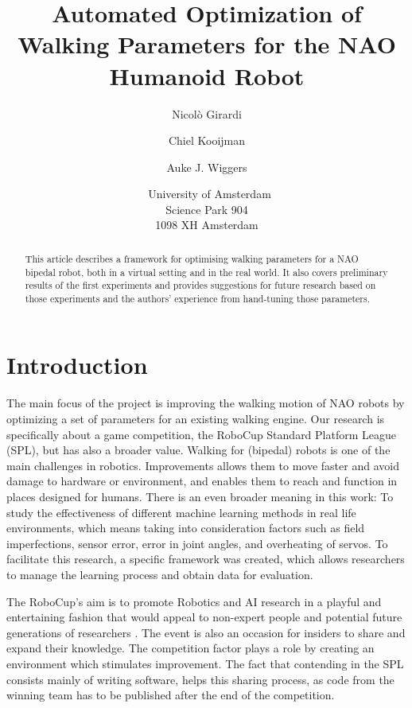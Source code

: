 \documentclass{article}
\title{\huge Automated Optimization of Walking Parameters for the NAO Humanoid Robot}
\author{Nicol\`o Girardi \affila \and
	Chiel Kooijman \affila \and
	Auke J. Wiggers \affila}
\date{\affila\ University of Amsterdam\\Science Park 904\\1098 XH Amsterdam}
\begin{document}
\ttl
\thispagestyle{empty}

\begin{abstract}
	\noindent
	This article describes a framework for optimising walking parameters for a
	NAO bipedal robot, both in a virtual setting and in the real world. It also
	covers preliminary results of the first experiments and provides
	suggestions for future research based on those experiments and the authors'
	experience from hand-tuning those parameters.
\end{abstract}

\section{Introduction}
The main focus of the project is improving the walking motion of NAO robots by
optimizing a set of parameters for an existing walking engine. Our research is
specifically about a game competition, the RoboCup Standard Platform League
(SPL), but has also a broader value. Walking for (bipedal) robots is one of the main
challenges in robotics. Improvements allows them to move faster and avoid damage 
to hardware or environment, and enables them to reach and function in
places designed for humans. There is an even broader meaning in this work:
To study the effectiveness of different machine learning methods in real
life environments, which means taking into consideration factors such as field
imperfections, sensor error, error in joint angles, and overheating of servos.
To facilitate this research, a specific framework was created, which allows
researchers to manage the learning process and obtain data for evaluation. 

The RoboCup's aim is to promote Robotics and AI research in a playful and
entertaining fashion that would appeal to non-expert people and potential
future generations of researchers \cite{kitano1997robocup}. The event is also
an occasion for insiders to share and expand their knowledge. The competition
factor plays a role by creating an environment which stimulates improvement.
The fact that contending in the SPL consists mainly of writing software, helps
this sharing process, as code from the winning team has to be published after
the end of the competition. 
\end{document}
